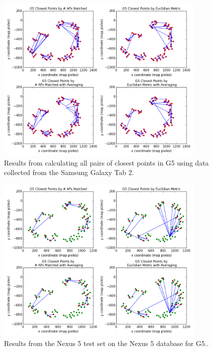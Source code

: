 \documentclass[11pt]{article}
\begin{document}
\begin{figure}[h]
\centering \includegraphics[width=0.9\textwidth]{samsungG5togethersamsungG5together_all_graphs.png}
\caption{Results from calculating all pairs of closest points in G5 using data collected from the Samsung Galaxy Tab 2.}
\label{fig:tunnels_all}
\end{figure}
\begin{figure}[h]
\centering \includegraphics[width=0.9\textwidth]{nexusG5trainnexusG5test_all_graphs.png}
\caption{Results from the Nexus 5 test set on the Nexus 5 database for G5..}
\label{fig:tunnels_all}
\end{figure}
\end{document}

